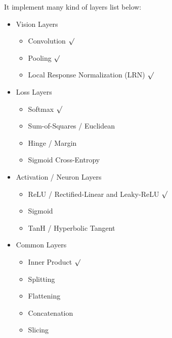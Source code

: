 \documentclass[12pt]{article}
\begin{document}
It implement many kind of layers list below:
\begin{itemize}
    \item Vision Layers
    \begin{itemize}
        \item Convolution $\surd$
        \item Pooling $\surd$
        \item Local Response Normalization (LRN) $\surd$
    \end{itemize}
    \item Loss Layers
    \begin{itemize}
        \item Softmax $\surd$
        \item Sum-of-Squares / Euclidean
        \item Hinge / Margin
        \item Sigmoid Cross-Entropy
    \end{itemize}
    \item Activation / Neuron Layers
    \begin{itemize}
        \item ReLU / Rectified-Linear and Leaky-ReLU $\surd$
        \item Sigmoid
        \item TanH / Hyperbolic Tangent
    \end{itemize}
    \item Common Layers
    \begin{itemize}
        \item Inner Product $\surd$
        \item Splitting
        \item Flattening
        \item Concatenation
        \item Slicing
    \end{itemize}
\end{itemize}
\end{document}
